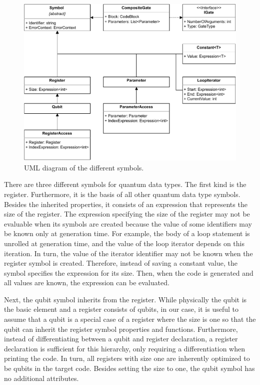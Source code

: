 \begin{figure}[htp]
    \centering
    \includegraphics[width=.9\textwidth]{../figures/drawio/uml_symbols.pdf}
    \caption{UML diagram of the different symbols.}
    \label{fig:implementation_uml_symbols}
\end{figure}

There are three different symbols for quantum data types. The first kind is the register. Furthermore, it is the basis of all other quantum data type symbols. Besides the inherited properties, it consists of an expression that represents the size of the register. The expression specifying the size of the register may not be evaluable when its symbols are created because the value of some identifiers may be known only at generation time.
For example, the body of a loop statement is unrolled at generation time, and the value of the loop iterator depends on this iteration. In turn, the value of the iterator identifier may not be known when the register symbol is created. Therefore, instead of saving a constant value, the symbol specifies the expression for its size. Then, when the code is generated and all values are known, the expression can be evaluated.

Next, the qubit symbol inherits from the register. While physically the qubit is the basic element and a register consists of qubits, in our case, it is useful to assume that a qubit is a special case of a register where the size is one so that the qubit can inherit the register symbol properties and functions. Furthermore, instead of differentiating between a qubit and register declaration, a register declaration is sufficient for this hierarchy, only requiring a differentiation when printing the code. In turn, all registers with size one are inherently optimized to be qubits in the target code. Besides setting the size to one, the qubit symbol has no additional attributes.

